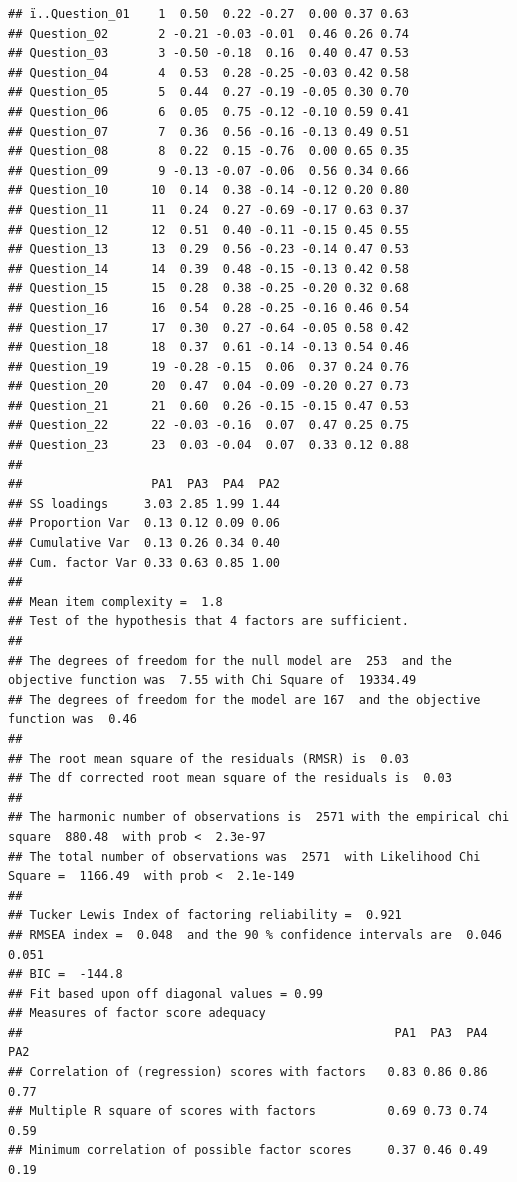 \documentclass[
]{book}
\begin{document}
\begin{verbatim}
## ï..Question_01    1  0.50  0.22 -0.27  0.00 0.37 0.63
## Question_02       2 -0.21 -0.03 -0.01  0.46 0.26 0.74
## Question_03       3 -0.50 -0.18  0.16  0.40 0.47 0.53
## Question_04       4  0.53  0.28 -0.25 -0.03 0.42 0.58
## Question_05       5  0.44  0.27 -0.19 -0.05 0.30 0.70
## Question_06       6  0.05  0.75 -0.12 -0.10 0.59 0.41
## Question_07       7  0.36  0.56 -0.16 -0.13 0.49 0.51
## Question_08       8  0.22  0.15 -0.76  0.00 0.65 0.35
## Question_09       9 -0.13 -0.07 -0.06  0.56 0.34 0.66
## Question_10      10  0.14  0.38 -0.14 -0.12 0.20 0.80
## Question_11      11  0.24  0.27 -0.69 -0.17 0.63 0.37
## Question_12      12  0.51  0.40 -0.11 -0.15 0.45 0.55
## Question_13      13  0.29  0.56 -0.23 -0.14 0.47 0.53
## Question_14      14  0.39  0.48 -0.15 -0.13 0.42 0.58
## Question_15      15  0.28  0.38 -0.25 -0.20 0.32 0.68
## Question_16      16  0.54  0.28 -0.25 -0.16 0.46 0.54
## Question_17      17  0.30  0.27 -0.64 -0.05 0.58 0.42
## Question_18      18  0.37  0.61 -0.14 -0.13 0.54 0.46
## Question_19      19 -0.28 -0.15  0.06  0.37 0.24 0.76
## Question_20      20  0.47  0.04 -0.09 -0.20 0.27 0.73
## Question_21      21  0.60  0.26 -0.15 -0.15 0.47 0.53
## Question_22      22 -0.03 -0.16  0.07  0.47 0.25 0.75
## Question_23      23  0.03 -0.04  0.07  0.33 0.12 0.88
## 
##                  PA1  PA3  PA4  PA2
## SS loadings     3.03 2.85 1.99 1.44
## Proportion Var  0.13 0.12 0.09 0.06
## Cumulative Var  0.13 0.26 0.34 0.40
## Cum. factor Var 0.33 0.63 0.85 1.00
## 
## Mean item complexity =  1.8
## Test of the hypothesis that 4 factors are sufficient.
## 
## The degrees of freedom for the null model are  253  and the objective function was  7.55 with Chi Square of  19334.49
## The degrees of freedom for the model are 167  and the objective function was  0.46 
## 
## The root mean square of the residuals (RMSR) is  0.03 
## The df corrected root mean square of the residuals is  0.03 
## 
## The harmonic number of observations is  2571 with the empirical chi square  880.48  with prob <  2.3e-97 
## The total number of observations was  2571  with Likelihood Chi Square =  1166.49  with prob <  2.1e-149 
## 
## Tucker Lewis Index of factoring reliability =  0.921
## RMSEA index =  0.048  and the 90 % confidence intervals are  0.046 0.051
## BIC =  -144.8
## Fit based upon off diagonal values = 0.99
## Measures of factor score adequacy             
##                                                    PA1  PA3  PA4  PA2
## Correlation of (regression) scores with factors   0.83 0.86 0.86 0.77
## Multiple R square of scores with factors          0.69 0.73 0.74 0.59
## Minimum correlation of possible factor scores     0.37 0.46 0.49 0.19
\end{verbatim}
\end{document}
